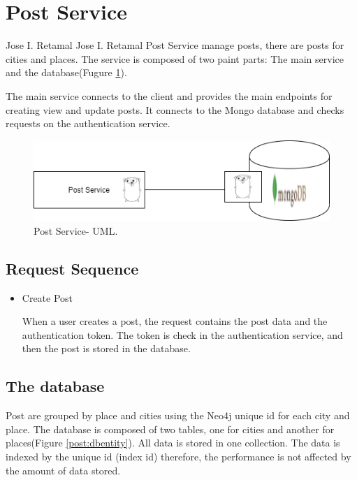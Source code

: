\section{Post Service}{Jose I. Retamal }
Jose I. Retamal
\vskip 0.1in
\indent
\indent
Post Service manage posts, there are posts for cities and places. The service is composed of two paint parts: The main service and the database(Fugure \ref{post:mainuml}).
 
The main service connects to the client and provides the main endpoints for creating view and update posts. It connects to the Mongo database and checks requests on the authentication service. 


\begin{figure}[H]
	\begin{center}
		\includegraphics[width=120mm,scale=1]{img/post/post-main-uml.png}
		\caption{Post Service- UML.}
		\label{post:mainuml}
	\end{center}
	
\end{figure}

\subsection{Request Sequence}

\begin{itemize}
	\item Create Post 
	
	When a user creates a post, the request contains the post data and the authentication token. The token is check in the authentication service, and then the post is stored in the database.
\end{itemize}

\subsection{The database}

Post are grouped by place and cities using the Neo4j unique id for each city and place. The database is composed of two tables, one for cities and another for places(Figure \ref{post:dbentity}).
All data is stored in one collection. The data is indexed by the unique id (index id) therefore, the performance is not affected by the amount of data stored.

